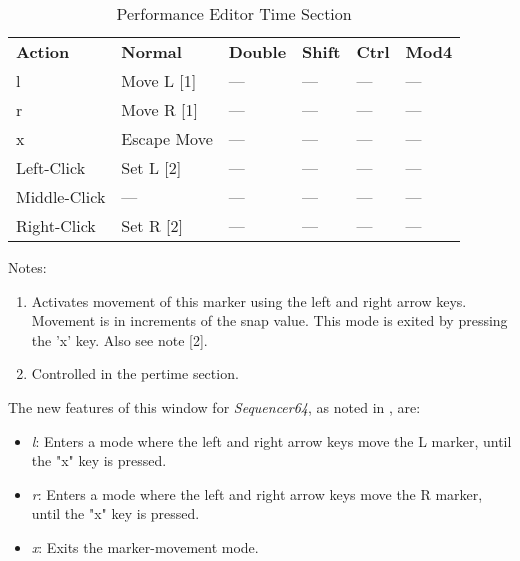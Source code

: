    \begin{table}
      \centering
      \caption{Performance Editor Time Section}
      \label{table:performance_editor_time_section}
      \begin{tabular}{l l l l l l}
         \textbf{Action}   & \textbf{Normal} & \textbf{Double}    & 
            \textbf{Shift} & \textbf{Ctrl}   & \textbf{Mod4}      \\
         l                 & Move L [1]      & ---                &
            ---            & ---             & ---                \\
         r                 & Move R [1]      & ---                &
            ---            & ---             & ---                \\
         x                 & Escape Move     & ---                &
            ---            & ---             & ---                \\
         Left-Click        & Set L [2]       & ---                &
            ---            & ---             & ---                \\
         Middle-Click      & ---             & ---                &
            ---            & ---             & ---                \\
         Right-Click       & Set R [2]       & ---                &
            ---            & ---             & ---                \\
      \end{tabular}
   \end{table}

   Notes:

      \begin{enumerate}
         \item Activates movement of this marker using the left and right arrow
            keys.  Movement is in increments of the snap value.  This mode is
            exited by pressing the 'x' key.  Also see note [2].
         \item Controlled in the pertime section.
      \end{enumerate}

   The new features of this window for \textsl{Sequencer64},
   as noted in
   ,
   are:

   \begin{itemize}
      \item \textsl{l}:  Enters a mode where the left and right arrow keys move
         the L marker, until the "x" key is pressed.
      \item \textsl{r}:  Enters a mode where the left and right arrow keys move
         the R marker, until the "x" key is pressed.
      \item \textsl{x}:  Exits the marker-movement  mode.
   \end{itemize}

